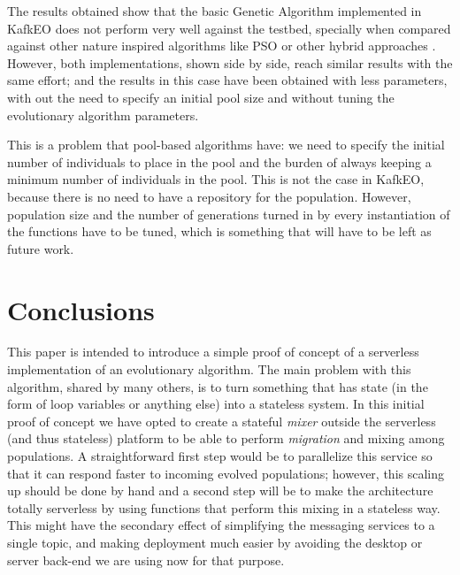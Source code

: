 \documentclass[sigconf]{acmart}
\begin{document}
The results obtained show that the basic Genetic Algorithm implemented
in KafkEO does not perform
very well against the testbed, specially when compared against other nature 
inspired algorithms like PSO or other hybrid approaches \cite{hansen2010bbob}.
However, both implementations, shown side by side, reach similar results with the same 
effort; and the results in this case have been obtained with less
parameters, with out the need to specify an initial pool size and  
without tuning the evolutionary algorithm parameters.

This is a problem that pool-based algorithms have: we need to
specify the initial number of individuals to place in the pool and the
burden of always keeping a minimum number of individuals in the pool. This
is not the case in KafkEO, because there is no need to have a
repository for the population. However, population size and the number
of generations turned in by every instantiation of the functions have
to be tuned, which is something that will have to be left as future
work.


\section{Conclusions}
\label{sec:con}

This paper is intended to introduce a simple proof of concept of a
serverless implementation of an evolutionary algorithm. The main
problem with this algorithm, shared by many others, is to turn
something that has state (in the form of loop variables or anything
else) into a stateless system. In this initial proof of concept we have
opted to create a stateful {\em mixer} outside the serverless (and
thus stateless) platform to be able to perform {\em
  migration} and mixing among populations. A straightforward first step
would be to parallelize this service so that it can respond faster to
incoming evolved populations; however, this scaling up should be done
by hand and a second step will be to make the architecture totally
serverless by using functions that perform this mixing in a stateless
way. This might have the secondary effect of simplifying the messaging
services to a single topic, and making deployment much easier by
avoiding the desktop or server back-end we are using now for that
purpose.
\end{document}
